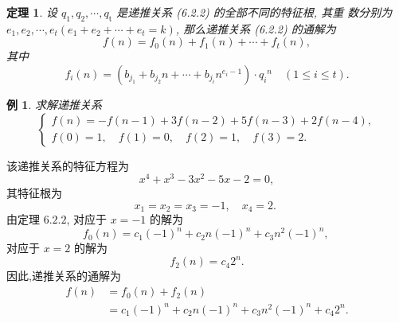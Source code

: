 \documentclass[punct]{ctexbeamer}
\newtheorem{thm}{定理}[section]
\newtheorem{ex}{例}[section]
\def\pf{\noindent {\bf 证明\ }}
\def\sol{\noindent {\bf 解\ }}
\begin{document}
%

\begin{frame}
	\begin{thm}
		设 $q_1, q_2, \cdots, q_{\mathrm{t}}$ 是递推关系 (6.2.2) 的全部不同的特征根, 其重 数分别为 $e_1, e_2, \cdots, e_t\left(e_1+e_2+\cdots+e_t=k\right)$, 那么递推关系 (6.2.2) 的通解为
		$$
		f(n)=f_0(n)+f_1(n)+\cdots+f_t(n),
		$$
		其中
		$$
		f_i(n)=\left(b_{j_1}+b_{j_2} n+\cdots+b_{j_i} n^{e_i-1}\right) \cdot q_i{ }^n \quad(1 \leqslant i \leqslant t) .
		$$
	\end{thm}
\end{frame}

\begin{frame}
	\begin{ex}
		求解递推关系
		$$
		\left\{\begin{array}{l}
			f(n)=-f(n-1)+3 f(n-2)+5 f(n-3)+2 f(n-4), \\
			f(0)=1, \quad f(1)=0, \quad f(2)=1, \quad f(3)=2 .
		\end{array}\right.
		$$
	\end{ex}
\pause\sol
该递推关系的特征方程为
$$
x^4+x^3-3 x^2-5 x-2=0,
$$
其特征根为
$$
x_1=x_2=x_3=-1, \quad x_4=2 \text {. }
$$
由定理 $6.2 .2$, 对应于 $x=-1$ 的解为
$$
f_0(n)=c_1(-1)^n+c_2 n(-1)^n+c_3 n^2(-1)^n \text {, }
$$
对应于 $x=2$ 的解为
$$
f_2(n)=c_4 2^n .
$$
因此,递推关系的通解为
$$
\begin{aligned}
	f(n) &=f_0(n)+f_2(n) \\
	&=c_1(-1)^n+c_2 n(-1)^n+c_3 n^2(-1)^n+c_4 2^n .
\end{aligned}
$$
\end{frame}
\end{document}
